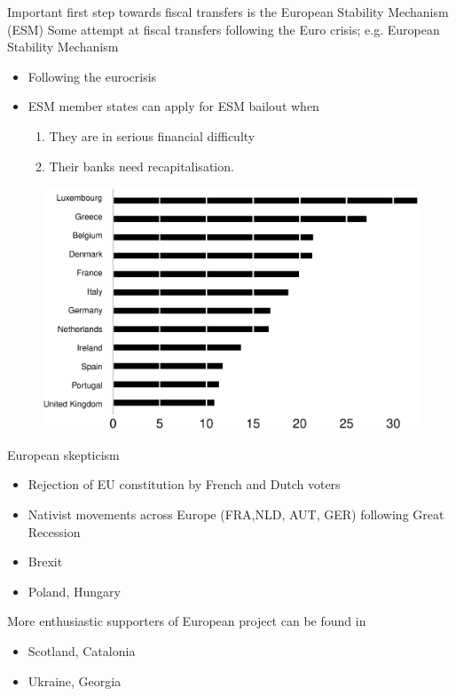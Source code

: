 \documentclass{beamer}
\begin{document}
\begin{frame}
 Important first step towards fiscal transfers is the European Stability Mechanism (ESM)
  Some attempt at fiscal transfers following the Euro crisis; e.g. European Stability Mechanism
  \begin{itemize}
    \item Following the eurocrisis
    \item ESM member states can apply for ESM bailout when 
    \begin{enumerate}
      \item They are in serious financial difficulty
      \item Their banks need recapitalisation. 
    \end{enumerate}
  \end{itemize}       
\end{frame}


\begin{frame}
  \begin{figure}
    \includegraphics[scale=.4]{eurobarometer.eps}
  \end{figure}
\end{frame}

\begin{frame}
  European skepticism
  \begin{itemize}
    \item Rejection of EU constitution by French and Dutch voters
    \item Nativist movements across Europe (FRA,NLD, AUT, GER) following Great Recession
    \item Brexit
    \item Poland, Hungary
  \end{itemize}
  \medskip
  More enthusiastic supporters of European project can be found in
  \begin{itemize}
    \item Scotland, Catalonia
    \item Ukraine, Georgia
  \end{itemize}
\end{frame}
\end{document}
